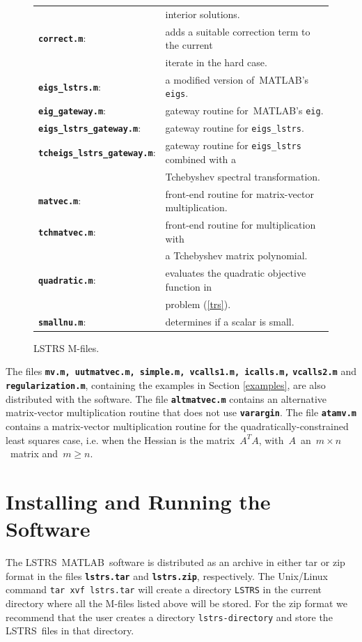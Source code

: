 \documentclass[acmtoms]{acmtrans2m}
\newcommand{\trans}{^{\scriptscriptstyle T}}
\newcommand{\noeq}{A\trans{A}}
\newcommand{\trsref}{(\ref{trs})}
\newcommand{\matlab}{MATLAB}
\newcommand{\mlstrs}{LSTRS}
\begin{document}
\begin{figure}[h!tbp]
\begin{tabular}{ll}
& interior solutions.\\
{\tt\bf correct.m}: &  adds a suitable correction term to the current\\
& iterate in the hard case.\\
{\tt\bf eigs\_lstrs.m}: & a modified version of\ \matlab's {\tt eigs}.\\
{\tt\bf eig\_gateway.m}:& gateway routine for\ \matlab's {\tt eig}.\\
{\tt\bf eigs\_lstrs\_gateway.m}:& gateway routine for {\tt eigs\_lstrs}.\\
{\tt\bf tcheigs\_lstrs\_gateway.m}:& gateway routine for {\tt eigs\_lstrs} combined with a \\
& Tchebyshev spectral transformation.\\
{\tt\bf matvec.m}: & front-end routine for matrix-vector multiplication.\\
{\tt\bf tchmatvec.m}: & front-end routine for multiplication with \\
&  a Tchebyshev matrix polynomial.\\
{\tt\bf quadratic.m}: & evaluates the quadratic objective function in\\
& problem \trsref.\\
{\tt\bf smallnu.m}: & determines if a scalar is small.
\end{tabular}
\caption{LSTRS M-files.}\label{files}
\end{figure}

The files {\tt\bf mv.m, uutmatvec.m, simple.m, vcalls1.m, icalls.m,}\linebreak
{\tt\bf vcalls2.m} and {\tt\bf regularization.m}, containing the examples
in Section \ref{examples}, are also distributed with the software.
The file {\tt\bf altmatvec.m} contains an alternative matrix-vector multiplication
routine that does not use {\tt\bf varargin}. The file {\tt\bf atamv.m} contains
a matrix-vector multiplication routine for the quadratically-constrained least
squares case, i.e. when the Hessian is the matrix\ $\noeq$,
with\ $A$\ an\ $m\times n$\ matrix and\ $m\geq n$.

\section{Installing and Running the Software}\label{install}

The \mlstrs\ \matlab\ software is distributed as an archive in either tar or zip format in
the files {\tt\bf lstrs.tar} and {\tt\bf lstrs.zip}, respectively. The Unix/Linux command
{\tt tar xvf lstrs.tar} will create a directory {\tt LSTRS} in the current directory 
where all the M-files listed above will be stored. For the zip format we recommend
that the user creates a directory {\tt lstrs-directory} and store the \mlstrs\ files
in that directory.
\end{document}
